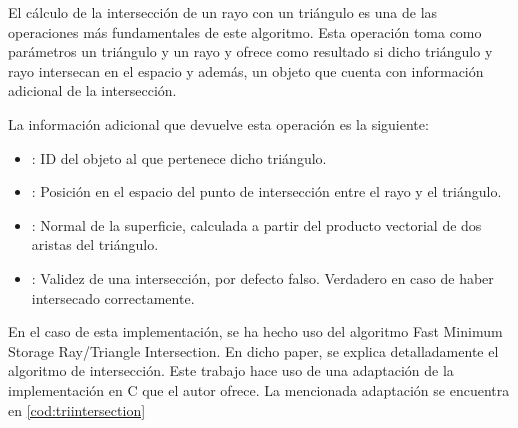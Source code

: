 El cálculo de la intersección de un rayo con un triángulo es una de las operaciones más fundamentales de este algoritmo. Esta operación toma como parámetros un triángulo  y un rayo  y ofrece como resultado si dicho triángulo y rayo intersecan en el espacio y además, un objeto  que cuenta con información adicional de la intersección.

La información adicional que devuelve esta operación es la siguiente:

\begin{itemize}
	
	\item {}: ID del objeto al que pertenece dicho triángulo.
	
	\item {}: Posición en el espacio del punto de intersección entre el rayo y el triángulo.
	
	\item {}: Normal de la superficie, calculada a partir del producto vectorial de dos aristas del triángulo.
	
	\item {}: Validez de una intersección, por defecto falso. Verdadero en caso de haber intersecado correctamente.

\end{itemize}

En el caso de esta implementación, se ha hecho uso del algoritmo Fast Minimum Storage Ray/Triangle Intersection\cite{moller1997fast}. En dicho paper, se explica detalladamente el algoritmo de intersección. Este trabajo hace uso de una adaptación de la implementación en C que el autor ofrece. La mencionada adaptación se encuentra en \autoref{cod:triintersection}
	
